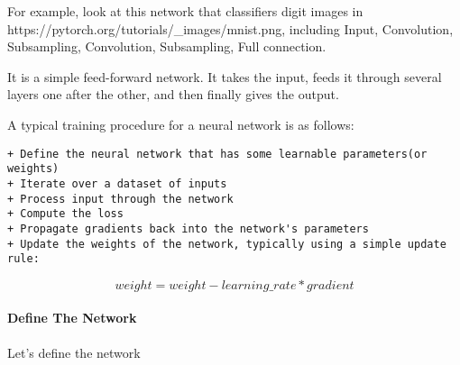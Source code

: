 \documentclass{ctexart}
\begin{document}
For example, look at this network that classifiers digit images in
https://pytorch.org/tutorials/\_images/mnist.png, including Input,
Convolution, Subsampling, Convolution, Subsampling, Full connection.

It is a simple feed-forward network. It takes the input, feeds it
through several layers one after the other, and then finally gives the
output.

A typical training procedure for a neural network is as follows:

\begin{verbatim}
+ Define the neural network that has some learnable parameters(or weights)
+ Iterate over a dataset of inputs
+ Process input through the network
+ Compute the loss
+ Propagate gradients back into the network's parameters
+ Update the weights of the network, typically using a simple update rule:
\end{verbatim}

\[weight = weight - learning\_rate * gradient\]

    \paragraph{Define The Network}\label{define-the-network}

Let's define the network
\end{document}

